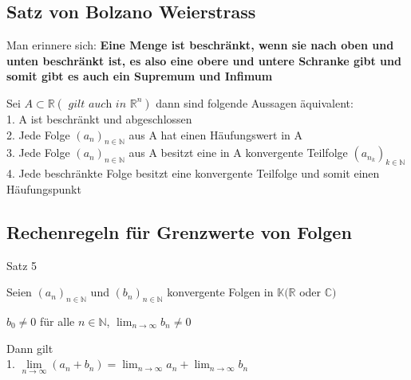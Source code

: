 \documentclass[headsepline,12pt,a4paper]{scrartcl}
\begin{document}
\subsection*{Satz von Bolzano Weierstrass}

\item Man erinnere sich: \textbf{Eine Menge ist beschränkt, wenn sie nach oben und unten beschränkt ist, es also eine obere und untere Schranke gibt und somit gibt es auch ein Supremum und Infimum}
\item Sei $ A \subset \mathbb{R} ( \textit{ gilt auch in }  \mathbb{R}^n  ) $ dann sind folgende Aussagen äquivalent: \\

1. A ist beschränkt und abgeschlossen \\

2. Jede Folge $(a_n)_{n\in \mathbb{N}}$ aus A hat einen Häufungswert in A \\

3. Jede Folge $(a_n)_{n\in \mathbb{N}} $ aus A besitzt eine in A konvergente Teilfolge $(a_{n_k})_{k\in \mathbb{N}} $ \\

4. Jede beschränkte Folge besitzt eine konvergente Teilfolge und somit einen Häufungspunkt \\



\newpage

\subsection*{Rechenregeln für Grenzwerte von Folgen}

\item[Satz 5]

Seien $(a_n)_{n\in \mathbb{N}}$ und $(b_n)_{n\in \mathbb{N}}$ konvergente Folgen in $\mathbb{K}(\mathbb{R}$ oder $\mathbb{C})$ \\

\begin{center}
$b_0 \neq 0 $ für alle $n \in \mathbb{N}$, $\lim_{n \rightarrow \infty} b_n \neq 0 $ \\
\end{center}

Dann gilt \\

1. $\lim\limits_{n \rightarrow \infty} (a_n + b_n) = \lim_{n \rightarrow \infty} a_n + \lim_{n \rightarrow \infty} b_n $ \\
\end{document}
